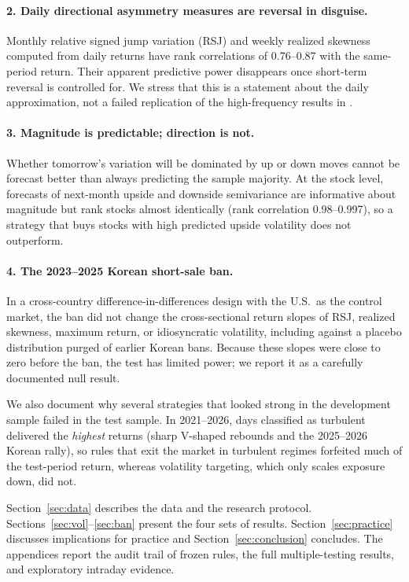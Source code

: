 \documentclass[11pt]{article}
\begin{document}
\paragraph{2. Daily directional asymmetry measures are reversal in disguise.} Monthly relative signed jump variation (RSJ) and weekly realized skewness computed from daily returns have rank correlations of 0.76--0.87 with the same-period return. Their apparent predictive power disappears once short-term reversal is controlled for. We stress that this is a statement about the daily approximation, not a failed replication of the high-frequency results in \citet{amaya2015}.

\paragraph{3. Magnitude is predictable; direction is not.} Whether tomorrow's variation will be dominated by up or down moves cannot be forecast better than always predicting the sample majority. At the stock level, forecasts of next-month upside and downside semivariance are informative about magnitude but rank stocks almost identically (rank correlation 0.98--0.997), so a strategy that buys stocks with high predicted upside volatility does not outperform.

\paragraph{4. The 2023--2025 Korean short-sale ban.} In a cross-country difference-in-differences design with the U.S.\ as the control market, the ban did not change the cross-sectional return slopes of RSJ, realized skewness, maximum return, or idiosyncratic volatility, including against a placebo distribution purged of earlier Korean bans. Because these slopes were close to zero before the ban, the test has limited power; we report it as a carefully documented null result.

We also document why several strategies that looked strong in the development sample failed in the test sample. In 2021--2026, days classified as turbulent delivered the \emph{highest} returns (sharp V-shaped rebounds and the 2025--2026 Korean rally), so rules that exit the market in turbulent regimes forfeited much of the test-period return, whereas volatility targeting, which only scales exposure down, did not.

Section~\ref{sec:data} describes the data and the research protocol. Sections~\ref{sec:vol}--\ref{sec:ban} present the four sets of results. Section~\ref{sec:practice} discusses implications for practice and Section~\ref{sec:conclusion} concludes. The appendices report the audit trail of frozen rules, the full multiple-testing results, and exploratory intraday evidence.
\end{document}
